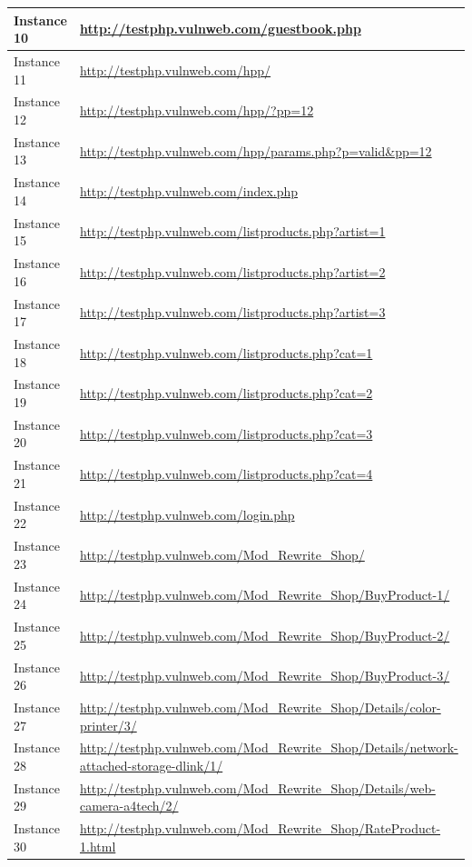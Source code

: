 \documentclass[12pt]{article}
\begin{document}
\begin{center}
\begin{longtable}{|l|p{10cm}|}
\hline
Instance 10 & \url{http://testphp.vulnweb.com/guestbook.php} \\
\hline
Instance 11 & \url{http://testphp.vulnweb.com/hpp/} \\
\hline
Instance 12 & \url{http://testphp.vulnweb.com/hpp/?pp=12} \\
\hline
Instance 13 & \url{http://testphp.vulnweb.com/hpp/params.php?p=valid\&pp=12} \\
\hline
Instance 14 & \url{http://testphp.vulnweb.com/index.php} \\
\hline
Instance 15 & \url{http://testphp.vulnweb.com/listproducts.php?artist=1} \\
\hline
Instance 16 & \url{http://testphp.vulnweb.com/listproducts.php?artist=2} \\
\hline
Instance 17 & \url{http://testphp.vulnweb.com/listproducts.php?artist=3} \\
\hline
Instance 18 & \url{http://testphp.vulnweb.com/listproducts.php?cat=1} \\
\hline
Instance 19 & \url{http://testphp.vulnweb.com/listproducts.php?cat=2} \\
\hline
Instance 20 & \url{http://testphp.vulnweb.com/listproducts.php?cat=3} \\
\hline
Instance 21 & \url{http://testphp.vulnweb.com/listproducts.php?cat=4} \\
\hline
Instance 22 & \url{http://testphp.vulnweb.com/login.php} \\
\hline
Instance 23 & \url{http://testphp.vulnweb.com/Mod\_Rewrite\_Shop/} \\
\hline
Instance 24 & \url{http://testphp.vulnweb.com/Mod\_Rewrite\_Shop/BuyProduct-1/} \\
\hline
Instance 25 & \url{http://testphp.vulnweb.com/Mod\_Rewrite\_Shop/BuyProduct-2/} \\
\hline
Instance 26 & \url{http://testphp.vulnweb.com/Mod\_Rewrite\_Shop/BuyProduct-3/} \\
\hline
Instance 27 & \url{http://testphp.vulnweb.com/Mod\_Rewrite\_Shop/Details/color-printer/3/} \\
\hline
Instance 28 & \url{http://testphp.vulnweb.com/Mod\_Rewrite\_Shop/Details/network-attached-storage-dlink/1/} \\
\hline
Instance 29 & \url{http://testphp.vulnweb.com/Mod\_Rewrite\_Shop/Details/web-camera-a4tech/2/} \\
\hline
Instance 30 & \url{http://testphp.vulnweb.com/Mod\_Rewrite\_Shop/RateProduct-1.html} \\
\hline

\end{longtable}
\end{center}
\end{document}
